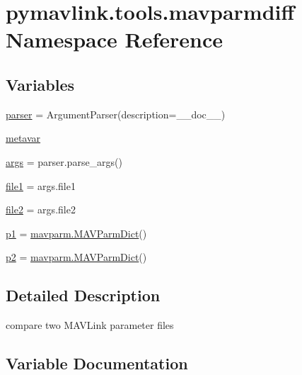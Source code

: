 \hypertarget{namespacepymavlink_1_1tools_1_1mavparmdiff}{}\section{pymavlink.\+tools.\+mavparmdiff Namespace Reference}
\label{namespacepymavlink_1_1tools_1_1mavparmdiff}
\subsection*{Variables}
\begin{DoxyCompactItemize}
\item 
\mbox{\hyperlink{namespacepymavlink_1_1tools_1_1mavparmdiff_ab64e4537cb0136a6e8bf263f627bb94d}{parser}} = Argument\+Parser(description=\+\_\+\+\_\+doc\+\_\+\+\_\+)
\item 
\mbox{\hyperlink{namespacepymavlink_1_1tools_1_1mavparmdiff_a68a751471fc698ef4fece1ff69d22945}{metavar}}
\item 
\mbox{\hyperlink{namespacepymavlink_1_1tools_1_1mavparmdiff_abdc8d490a1a9a59241924f1be0a5315c}{args}} = parser.\+parse\+\_\+args()
\item 
\mbox{\hyperlink{namespacepymavlink_1_1tools_1_1mavparmdiff_a94d7c01c0c30e2c1ab7be9b76fe353d6}{file1}} = args.\+file1
\item 
\mbox{\hyperlink{namespacepymavlink_1_1tools_1_1mavparmdiff_af9bca462c4a011fa7aa1158d0c23425b}{file2}} = args.\+file2
\item 
\mbox{\hyperlink{namespacepymavlink_1_1tools_1_1mavparmdiff_a06d51c19c63d03d6f2853641ffa5255a}{p1}} = \mbox{\hyperlink{classpymavlink_1_1mavparm_1_1MAVParmDict}{mavparm.\+M\+A\+V\+Parm\+Dict}}()
\item 
\mbox{\hyperlink{namespacepymavlink_1_1tools_1_1mavparmdiff_a9f0235810198201674e23d7c0e6d4f3b}{p2}} = \mbox{\hyperlink{classpymavlink_1_1mavparm_1_1MAVParmDict}{mavparm.\+M\+A\+V\+Parm\+Dict}}()
\end{DoxyCompactItemize}


\subsection{Detailed Description}
\begin{DoxyVerb}compare two MAVLink parameter files
\end{DoxyVerb}
 

\subsection{Variable Documentation}
\mbox{\label{namespacepymavlink_1_1tools_1_1mavparmdiff_abdc8d490a1a9a59241924f1be0a5315c}} 
